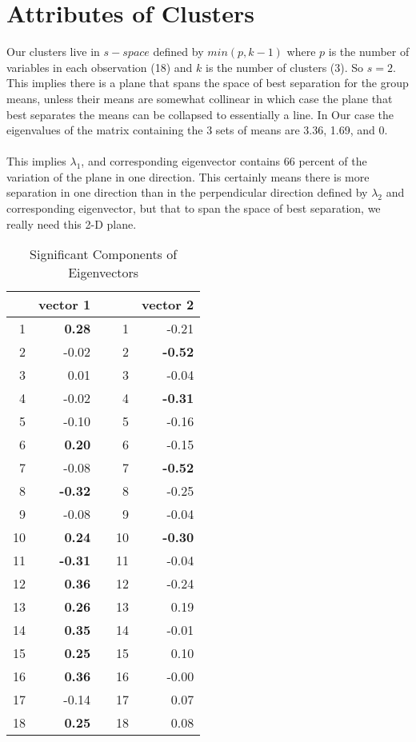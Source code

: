\documentclass[11pt]{article}
\begin{document}
\section*{Attributes of Clusters}
Our clusters live in $s-space$ defined by $min(p,k-1)$ where $p$ is the number of variables in each observation (18) and $k$ is the number of clusters (3). So $s=2$. This implies there is a plane that spans the space of best separation for the group means, unless their means are somewhat collinear in which case the plane that best separates the means can be collapsed to essentially a line. In Our case the eigenvalues of the matrix containing the 3 sets of means are 3.36, 1.69, and 0. 
\\
\\
This implies $\lambda_1$, and corresponding eigenvector contains 66 percent of the variation of the plane in one direction. This certainly means there is more separation in one direction than in the perpendicular direction defined by $\lambda_2$ and corresponding eigenvector, but that to span the space of best separation, we really need this 2-D plane.

\begin{table}[ht]
\centering
\begin{tabular}{rrlrr}
  \hline
 & vector 1 &  &  & vector 2 \\ 
  \hline
1 & \bf{0.28} &  & 1 & -0.21 \\ 
  2 & -0.02 &  & 2 & \bf{-0.52} \\ 
  3 & 0.01 &  & 3 & -0.04 \\ 
  4 & -0.02 &  & 4 & \bf{-0.31} \\ 
  5 & -0.10 &  & 5 & -0.16 \\ 
  6 & \bf{0.20} &  & 6 & -0.15 \\ 
  7 & -0.08 &  & 7 & \bf{-0.52} \\ 
  8 & \bf{-0.32} &  & 8 & -0.25 \\ 
  9 & -0.08 &  & 9 & -0.04 \\ 
  10 & \bf{0.24} &  & 10 & \bf{-0.30} \\ 
  11 & \bf{-0.31} &  & 11 & -0.04 \\ 
  12 & \bf{0.36} &  & 12 & -0.24 \\ 
  13 & \bf{0.26} &  & 13 & 0.19 \\ 
  14 & \bf{0.35} &  & 14 & -0.01 \\ 
  15 & \bf{0.25} &  & 15 & 0.10 \\ 
  16 & \bf{0.36} &  & 16 & -0.00 \\ 
  17 & -0.14 &  & 17 & 0.07 \\ 
  18 & \bf{0.25} &  & 18 & 0.08 \\ 
   \hline
\end{tabular}
\caption{Significant Components of Eigenvectors} 
\end{table}
\end{document}
